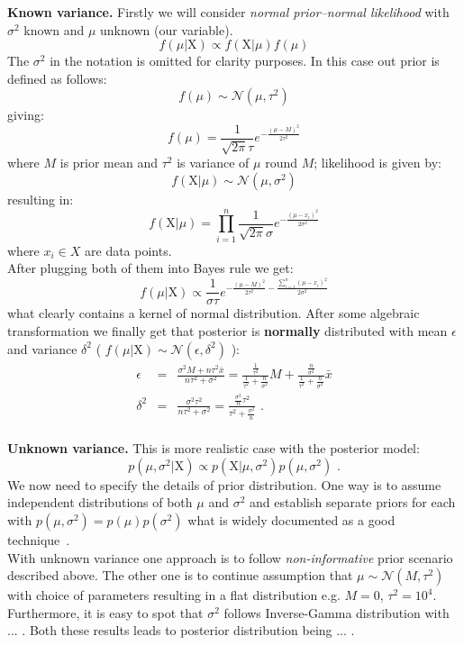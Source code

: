 \documentclass[12pt, a4paper, pdflatex]{report}
\begin{document}
\textbf{\textrm{Known variance. }}Firstly we will consider \emph{normal prior--normal likelihood} with $\sigma^2$ known and $\mu$ unknown (our variable).
$$
f \left( \mu | \mathrm{X} \right) \propto f \left( \mathrm{X} | \mu \right) f \left( \mu \right)
$$
The $\sigma^2$ in the notation is omitted for clarity purposes. In this case out prior is defined as follows:
$$
f \left( \mu \right)    \sim   \mathcal{N}\left( \mu, \tau^2 \right)
$$
giving:
$$
f \left( \mu \right)    =     \frac{1}{\sqrt{2\pi} \tau} e^{- \frac{{\left( \mu - M \right)}^2}{2 \tau^2} }
$$
where $M$ is prior mean and $\tau^2$ is variance of $\mu$ round $M$; likelihood is given by:
$$
f \left( \mathrm{X} | \mu \right)     \sim    \mathcal{N}\left( \mu, \sigma^2 \right)
$$
resulting in:
$$
f \left( \mathrm{X} | \mu \right)    =     \prod_{i=1}^{n} \frac{1}{\sqrt{2\pi} \sigma} e^{- \frac{{\left( \mu - x_i \right)}^2}{2 \sigma^2} }
$$
where $x_i \in X$ are data points.\\
After plugging both of them into Bayes rule we get:
$$
f \left( \mu | \mathrm{X} \right)     \propto     \frac{1}{\sigma \tau} e^{ -\frac{ {\left( \mu - M \right)}^2 }{2 \tau^2} -\frac{ \sum_{i=1}^{n} {\left( \mu - x_i \right)}^2 }{2 \sigma^2} }
$$
what clearly contains a kernel of normal distribution. After some algebraic transformation we finally get that posterior is \textbf{normally} distributed with mean $\epsilon$ and variance $\delta^2$ ( $f \left( \mu | \mathrm{X} \right) \sim \mathcal{N} \left( \epsilon, \delta^2 \right) $ ):
\begin{eqnarray*}
\epsilon &=& \frac{\sigma^2 M + n \tau^2 \bar{x}}{n \tau^2 + \sigma^2} = \frac{ \frac{1}{\tau^2} }{ \frac{1}{\tau^2} + \frac{n}{\sigma^2} }M + \frac{ \frac{n}{\sigma^2} }{ \frac{1}{\tau^2} + \frac{n}{\sigma^2} } \bar{x} \\
\delta^2 &=& \frac{\sigma^2 \tau^2}{n \tau^2 + \sigma^2} = \frac{ \frac{\sigma^2}{n} \tau^2 }{ \tau^2 + \frac{\sigma^2}{n} } \text{ .}
\end{eqnarray*}
\\

\textbf{\textrm{Unknown variance. }}This is more realistic case with the posterior model:
$$
p \left(  \mu, \sigma^2 | \mathrm{X} \right) \propto p \left( \mathrm{X} | \mu, \sigma^2 \right)    p \left( \mu, \sigma^2 \right) \text{ .}
$$
We now need to specify the details of prior distribution. One way is to assume independent distributions of both $\mu$ and $\sigma^2$ and establish separate priors for each with $p(\mu, \sigma^2) = p(\mu) p(\sigma^2)$ what is widely documented as a good technique~\cite{gelman2003bayesian}.\\
With unknown variance one approach is to follow \emph{non-informative} prior scenario described above. The other one is to continue assumption that $\mu \sim \mathcal{N} \left( M, \tau^2 \right)$ with choice of parameters resulting in a flat distribution e.g. $M=0$, $\tau^2 = 10^4$. Furthermore, it is easy to spot that $\sigma^2$ follows \textrm{Inverse}-\textrm{Gamma} distribution with ... . Both these results leads to posterior distribution being ... .\\
\end{document}
